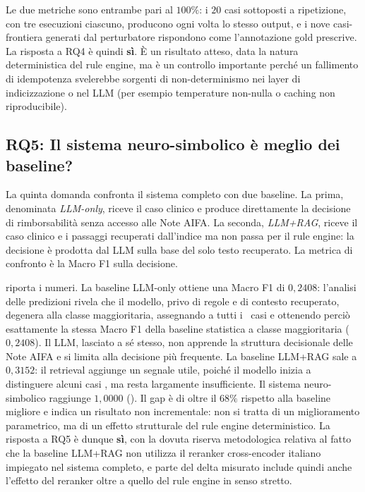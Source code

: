 Le due metriche sono entrambe pari al $100\%$: i $20$ casi sottoposti a ripetizione, con tre esecuzioni ciascuno, producono ogni volta lo stesso output, e i nove casi-frontiera generati dal perturbatore rispondono come l'annotazione gold prescrive. La risposta a RQ4 è quindi \textbf{sì}. È un risultato atteso, data la natura deterministica del rule engine, ma è un controllo importante perché un fallimento di idempotenza svelerebbe sorgenti di non-determinismo nei layer di indicizzazione o nel LLM (per esempio temperature non-nulla o caching non riproducibile).

\subsection{RQ5: Il sistema neuro-simbolico è meglio dei baseline?}
\label{sec:rq5}

La quinta domanda confronta il sistema completo con due baseline. La prima, denominata \emph{LLM-only}, riceve il caso clinico e produce direttamente la decisione di rimborsabilità senza accesso alle Note AIFA. La seconda, \emph{LLM+RAG}, riceve il caso clinico e i passaggi recuperati dall'indice ma non passa per il rule engine: la decisione è prodotta dal LLM sulla base del solo testo recuperato. La metrica di confronto è la Macro F1 sulla decisione.

 riporta i numeri. La baseline LLM-only ottiene una Macro F1 di $0{,}2408$: l'analisi delle predizioni rivela che il modello, privo di regole e di contesto recuperato, degenera alla classe maggioritaria, assegnando  a tutti i \goldn\ casi e ottenendo perciò esattamente la stessa Macro F1 della baseline statistica a classe maggioritaria ($0{,}2408$). Il LLM, lasciato a sé stesso, non apprende la struttura decisionale delle Note AIFA e si limita alla decisione più frequente. La baseline LLM+RAG sale a $0{,}3152$: il retrieval aggiunge un segnale utile, poiché il modello inizia a distinguere alcuni casi , ma resta largamente insufficiente. Il sistema neuro-simbolico raggiunge $1{,}0000$ (). Il gap è di oltre il $68\%$ rispetto alla baseline migliore e indica un risultato non incrementale: non si tratta di un miglioramento parametrico, ma di un effetto strutturale del rule engine deterministico. La risposta a RQ5 è dunque \textbf{sì}, con la dovuta riserva metodologica relativa al fatto che la baseline LLM+RAG non utilizza il reranker cross-encoder italiano impiegato nel sistema completo, e parte del delta misurato include quindi anche l'effetto del reranker oltre a quello del rule engine in senso stretto.

